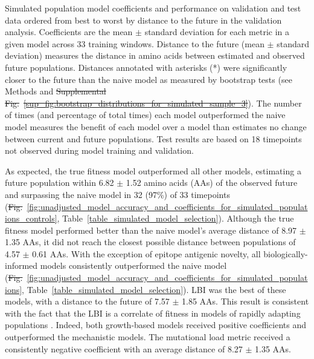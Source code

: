 \documentclass[9pt,lineno]{elife} %
\providecommand{\DIFadd}[1]{{\protect\color{blue}\uwave{#1}}} %
\providecommand{\DIFdel}[1]{{\protect\color{red}\sout{#1}}}                      %
\providecommand{\DIFaddbegin}{} %
\providecommand{\DIFaddend}{} %
\providecommand{\DIFdelbegin}{} %
\providecommand{\DIFdelend}{} %
\providecommand{\DIFaddFL}[1]{\DIFadd{#1}} %
\providecommand{\DIFdelFL}[1]{\DIFdel{#1}} %
\providecommand{\DIFaddbeginFL}{} %
\providecommand{\DIFaddendFL}{} %
\providecommand{\DIFdelbeginFL}{} %
\providecommand{\DIFdelendFL}{} %
\providecommand{\DIFaddtex}[1]{{\protect\color{blue}\uwave{#1}}} %
\providecommand{\DIFdeltex}[1]{{\protect\color{red}\sout{#1}}}                      %
\providecommand{\DIFaddbegin}{} %
\providecommand{\DIFaddend}{} %
\providecommand{\DIFdelbegin}{} %
\providecommand{\DIFdelend}{} %
\providecommand{\DIFaddFL}[1]{\DIFadd{#1}} %
\providecommand{\DIFdelFL}[1]{\DIFdel{#1}} %
\providecommand{\DIFaddbeginFL}{} %
\providecommand{\DIFaddendFL}{} %
\providecommand{\DIFdelbeginFL}{} %
\providecommand{\DIFdelendFL}{} %
\providecommand{\DIFadd}[1]{\texorpdfstring{\DIFaddtex{#1}}{#1}} %
\providecommand{\DIFdel}[1]{\texorpdfstring{\DIFdeltex{#1}}{}} %
\newcommand{\DIFscaledelfig}{0.5}
\newlength{\DIFdelgraphicswidth} %
\newlength{\DIFdelgraphicsheight} %
\newcommand{\DIFaddincludegraphics}[2][]{{\color{blue}\fbox{\DIFOincludegraphics[#1]{#2}}}} %
\newcommand{\DIFdelincludegraphics}[2][]{%
\sbox{\DIFdelgraphicsbox}{\DIFOincludegraphics[#1]{#2}}%
\settoboxwidth{\DIFdelgraphicswidth}{\DIFdelgraphicsbox} %
\settoboxtotalheight{\DIFdelgraphicsheight}{\DIFdelgraphicsbox} %
\scalebox{\DIFscaledelfig}{%
\parbox[b]{\DIFdelgraphicswidth}{\usebox{\DIFdelgraphicsbox}\\[-\baselineskip] \rule{\DIFdelgraphicswidth}{0em}}\llap{\resizebox{\DIFdelgraphicswidth}{\DIFdelgraphicsheight}{%
\setlength{\unitlength}{\DIFdelgraphicswidth}%
\begin{picture}(1,1)%
\thicklines\linethickness{2pt} %
{\color[rgb]{1,0,0}\put(0,0){\framebox(1,1){}}}%
{\color[rgb]{1,0,0}\put(0,0){\line( 1,1){1}}}%
{\color[rgb]{1,0,0}\put(0,1){\line(1,-1){1}}}%
\end{picture}%
}\hspace*{3pt}}} %
} %
\DeclareRobustCommand{\DIFaddbegin}{\DIFOaddbegin \let\includegraphics\DIFaddincludegraphics} %
\DeclareRobustCommand{\DIFaddend}{\DIFOaddend \let\includegraphics\DIFOincludegraphics} %
\DeclareRobustCommand{\DIFdelbegin}{\DIFOdelbegin \let\includegraphics\DIFdelincludegraphics} %
\DeclareRobustCommand{\DIFdelend}{\DIFOaddend \let\includegraphics\DIFOincludegraphics} %
\DeclareRobustCommand{\DIFaddbeginFL}{\DIFOaddbeginFL \let\includegraphics\DIFaddincludegraphics} %
\DeclareRobustCommand{\DIFaddendFL}{\DIFOaddendFL \let\includegraphics\DIFOincludegraphics} %
\DeclareRobustCommand{\DIFdelbeginFL}{\DIFOdelbeginFL \let\includegraphics\DIFdelincludegraphics} %
\DeclareRobustCommand{\DIFdelendFL}{\DIFOaddendFL \let\includegraphics\DIFOincludegraphics} %
\begin{document}
\begin{table}[htb]
\begin{center}
{    }
    \caption{
      Simulated population model coefficients and performance on validation and test data ordered from best to worst by distance to the future in the validation analysis.
      Coefficients are the mean $\pm$ standard deviation for each metric in a given model across 33 training windows.
      Distance to the future (mean $\pm$ standard deviation) measures the distance in amino acids between estimated and observed future populations.
      Distances annotated with asterisks (*) were significantly closer to the future than the naive model as measured by bootstrap tests (see Methods and \DIFdelbeginFL \DIFdelFL{Supplemental Fig.}\DIFdelendFL \DIFaddbeginFL \DIFaddFL{Figure}\DIFaddendFL ~\DIFdelbeginFL \DIFdelFL{\ref{sup_fig:bootstrap_distributions_for_simulated_sample_3}}\DIFdelendFL \DIFaddbeginFL \DIFaddFL{\ref{fig:bootstrap_distributions_for_simulated_sample_3}}\DIFaddendFL ).
      The number of times (and percentage of total times) each model outperformed the naive model measures the benefit of each model over a model than estimates no change between current and future populations.
      Test results are based on 18 timepoints not observed during model training and validation.
    }
    \label{table_simulated_model_selection}
  \end{center}
\end{table}

As expected, the true fitness model outperformed all other models, estimating a future population within 6.82 $\pm$ 1.52 amino acids (AAs) of the observed future and surpassing the naive model in 32 (97\%) of 33 timepoints (\DIFdelbegin \DIFdel{Fig.}\DIFdelend \DIFaddbegin \DIFadd{Figure}\DIFaddend ~\ref{fig:unadjusted_model_accuracy_and_coefficients_for_simulated_populations_controls}, Table~\ref{table_simulated_model_selection}).
Although the true fitness model performed better than the naive model's average distance of 8.97 $\pm$ 1.35 AAs, it did not reach the closest possible distance between populations of 4.57 $\pm$ 0.61 AAs.
With the exception of epitope antigenic novelty, all biologically-informed models consistently outperformed the naive model (\DIFdelbegin \DIFdel{Fig.}\DIFdelend \DIFaddbegin \DIFadd{Figure}\DIFaddend ~\ref{fig:unadjusted_model_accuracy_and_coefficients_for_simulated_populations}, Table~\ref{table_simulated_model_selection}).
LBI was the best of these models, with a distance to the future of 7.57 $\pm$ 1.85 AAs.
This result is consistent with the fact that the LBI is a correlate of fitness in models of rapidly adapting populations \DIFdelbegin %
\DIFdelend \DIFaddbegin \citep{Neher:2014eu}\DIFaddend .
Indeed, both growth-based models received positive coefficients and outperformed the mechanistic models.
The mutational load metric received a consistently negative coefficient with an average distance of 8.27 $\pm$ 1.35 AAs.
\end{document}
